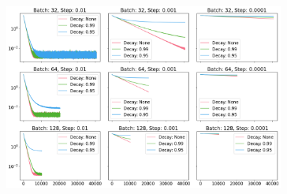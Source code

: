 \documentclass[12pt]{article}
\begin{document}
\begin{figure}[ht]
    \centering
    \includegraphics[width=0.82\textwidth]{./imgs/SGD.png}
\end{figure}
\end{document}
